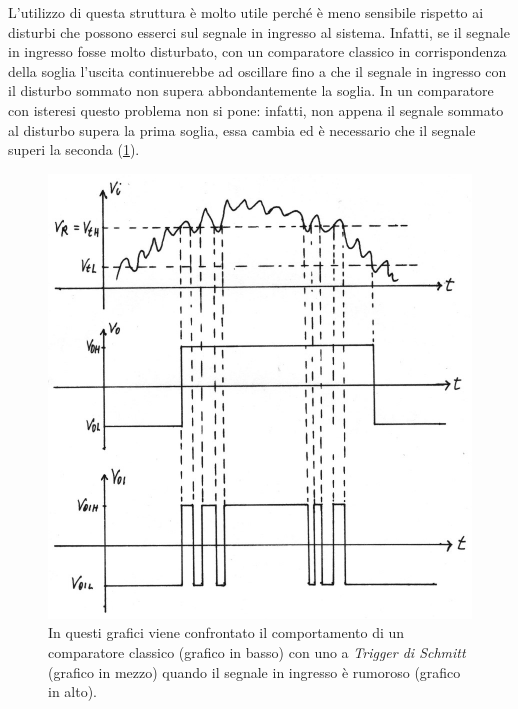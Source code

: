 \noindent
L'utilizzo di questa struttura è molto utile perché è meno sensibile rispetto ai disturbi che possono esserci sul segnale in ingresso al sistema. Infatti, se il segnale in ingresso fosse molto disturbato, con un comparatore classico in corrispondenza della soglia l'uscita continuerebbe ad oscillare fino a che il segnale in ingresso con il disturbo sommato non supera abbondantemente la soglia. In un comparatore con isteresi questo problema non si pone: infatti, non appena il segnale sommato al disturbo supera la prima soglia, essa cambia ed è necessario che il segnale superi la seconda (\Fig\ref{fig:trigger_di_shmitt_vantaggi}).

\begin{figure}[h!]
	\centering
	\includegraphics[width=0.8\linewidth]{./ImageFiles/Laboratorio 3/Usicta Rumorosa e Trigger di Shmitt.jpg}
	\caption{In questi grafici viene confrontato il comportamento di un comparatore classico (grafico in basso) con uno a \textit{Trigger di Schmitt} (grafico in mezzo) quando il segnale in ingresso è rumoroso (grafico in alto).}
	\label{fig:trigger_di_shmitt_vantaggi}
\end{figure} 

